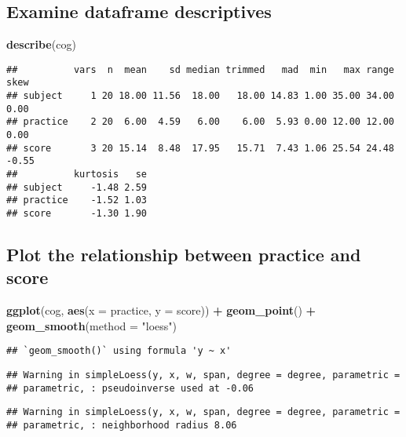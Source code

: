 \documentclass[]{article}
\newenvironment{Shaded}{\begin{snugshade}}{\end{snugshade}}
\newcommand{\KeywordTok}[1]{\textcolor[rgb]{0.13,0.29,0.53}{\textbf{#1}}}
\newcommand{\DataTypeTok}[1]{\textcolor[rgb]{0.13,0.29,0.53}{#1}}
\newcommand{\StringTok}[1]{\textcolor[rgb]{0.31,0.60,0.02}{#1}}
\newcommand{\OperatorTok}[1]{\textcolor[rgb]{0.81,0.36,0.00}{\textbf{#1}}}
\newcommand{\NormalTok}[1]{#1}
\begin{document}
\subsection{Examine dataframe
descriptives}\label{examine-dataframe-descriptives}

\begin{Shaded}
\begin{Highlighting}[]
\KeywordTok{describe}\NormalTok{(cog)}
\end{Highlighting}
\end{Shaded}

\begin{verbatim}
##          vars  n  mean    sd median trimmed   mad  min   max range  skew
## subject     1 20 18.00 11.56  18.00   18.00 14.83 1.00 35.00 34.00  0.00
## practice    2 20  6.00  4.59   6.00    6.00  5.93 0.00 12.00 12.00  0.00
## score       3 20 15.14  8.48  17.95   15.71  7.43 1.06 25.54 24.48 -0.55
##          kurtosis   se
## subject     -1.48 2.59
## practice    -1.52 1.03
## score       -1.30 1.90
\end{verbatim}

\subsection{Plot the relationship between practice and
score}\label{plot-the-relationship-between-practice-and-score}

\begin{Shaded}
\begin{Highlighting}[]
\KeywordTok{ggplot}\NormalTok{(cog, }\KeywordTok{aes}\NormalTok{(}\DataTypeTok{x =}\NormalTok{ practice, }\DataTypeTok{y =}\NormalTok{ score)) }\OperatorTok{+}
\StringTok{  }\KeywordTok{geom_point}\NormalTok{() }\OperatorTok{+}
\StringTok{  }\KeywordTok{geom_smooth}\NormalTok{(}\DataTypeTok{method =} \StringTok{"loess"}\NormalTok{)}
\end{Highlighting}
\end{Shaded}

\begin{verbatim}
## `geom_smooth()` using formula 'y ~ x'
\end{verbatim}

\begin{verbatim}
## Warning in simpleLoess(y, x, w, span, degree = degree, parametric =
## parametric, : pseudoinverse used at -0.06
\end{verbatim}

\begin{verbatim}
## Warning in simpleLoess(y, x, w, span, degree = degree, parametric =
## parametric, : neighborhood radius 8.06
\end{verbatim}
\end{document}
